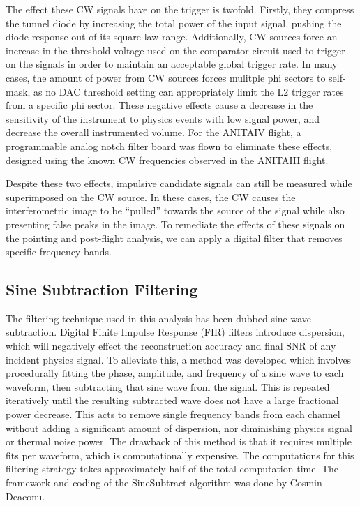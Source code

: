 	The effect these CW signals have on the trigger is twofold.  Firstly, they compress the tunnel diode by increasing the total power of the input signal, pushing the diode response out of its square-law range.  Additionally, CW sources force an increase in the threshold voltage used on the comparator circuit used to trigger on the signals in order to maintain an acceptable global trigger rate.  In many cases, the amount of power from CW sources forces mulitple phi sectors to self-mask, as no DAC threshold setting can appropriately limit the L2 trigger rates from a specific phi sector.  These negative effects cause a decrease in the sensitivity of the instrument to physics events with low signal power, and decrease the overall instrumented volume.  For the ANITAIV flight, a programmable analog notch filter board was flown to eliminate these effects, designed using the known CW frequencies observed in the ANITAIII flight.

	
	Despite these two effects, impulsive candidate signals can still be measured while superimposed on the CW source.  In these cases, the CW causes the interferometric image to be ``pulled'' towards the source of the signal while also presenting false peaks in the image.  To remediate the effects of these signals on the pointing and post-flight analysis, we can apply a digital filter that removes specific frequency bands.
	
	
	\subsection{Sine Subtraction Filtering}
		The filtering technique used in this analysis has been dubbed sine-wave subtraction.  Digital Finite Impulse Response (FIR) filters introduce dispersion, which will negatively effect the reconstruction accuracy and final SNR of any incident physics signal.  To alleviate this, a method was developed which involves procedurally fitting the phase, amplitude, and frequency of a sine wave to each waveform, then subtracting that sine wave from the signal.  This is repeated iteratively until the resulting subtracted wave does not have a large fractional power decrease.  This acts to remove single frequency bands from each channel without adding a significant amount of dispersion, nor diminishing physics signal or thermal noise power.  The drawback of this method is that it requires multiple fits per waveform, which is computationally expensive.  The computations for this filtering strategy takes approximately half of the total computation time.  The framework and coding of the SineSubtract algorithm was done by Cosmin Deaconu.  

